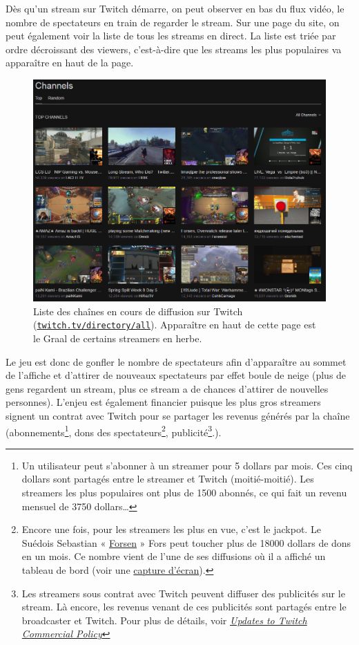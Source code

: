 \documentclass[a4paper]{article}
\begin{document}
Dès qu'un stream sur Twitch démarre, on peut observer en bas du flux vidéo, le nombre de spectateurs en train de regarder le stream. Sur une page du site, on peut également voir la liste de tous les streams en direct. La liste est triée par ordre décroissant des viewers, c'est-à-dire que les streams les plus populaires va apparaître en haut de la page.


\begin{figure}[!h]
	\centering
	\includegraphics[height=8.5cm]{channels.png}
	\caption{Liste des chaînes en cours de diffusion sur Twitch (\href{https://www.twitch.tv/directory/all}{\texttt{twitch.tv/directory/all}}). Apparaître en haut de cette page est le Graal de certains streamers en herbe.}
\end{figure}

Le jeu est donc de gonfler le nombre de spectateurs afin d'apparaître au sommet de l'affiche et d'attirer de nouveaux spectateurs par effet boule de neige (plus de gens regardent un stream, plus ce stream a de chances d'attirer de nouvelles personnes). L'enjeu est également financier puisque les plus gros streamers signent un contrat avec Twitch pour se partager les revenus générés par la chaîne (abonnements\footnote{Un utilisateur peut s'abonner à un streamer pour 5 dollars par mois. Ces cinq dollars sont partagés entre le streamer et Twitch (moitié-moitié). Les streamers les plus populaires ont plus de 1500 abonnés, ce qui fait un revenu mensuel de 3750 dollars\ldots}, dons des spectateurs\footnote{Encore une fois, pour les streamers les plus en vue, c'est le jackpot. Le Suédois Sebastian « \href{https://www.twitch.tv/forsenlol}{Forsen} » Fors peut toucher plus de 18000 dollars de dons en un mois. Ce nombre vient de l'une de ses diffusions où il a affiché un tableau de bord (voir une \href{http://imgur.com/gallery/OLyQNpk}{capture d'écran}).}, publicité\footnote{Les streamers sous contrat avec Twitch peuvent diffuser des publicités sur le stream. Là encore, les revenus venant de ces publicités sont partagés entre le broadcaster et Twitch. Pour plus de détails, voir \href{https://blog.twitch.tv/updates-to-twitch-commercial-policy-a35f5ce89afa}{\textit{Updates to Twitch Commercial Policy}}}.).
\end{document}
